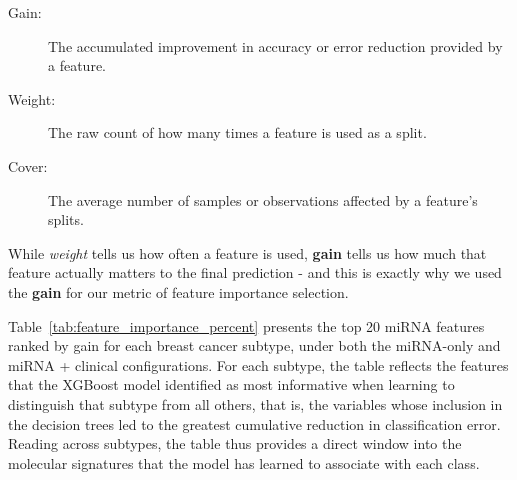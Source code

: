 \begin{description}
    \item[Gain:] The accumulated improvement in accuracy or error reduction provided by a feature.
    \item[Weight:] The raw count of how many times a feature is used as a split.
    \item[Cover:] The average number of samples or observations affected by a feature's splits.
\end{description}

While \textit{weight} tells us how often a feature is used, \textbf{gain} tells us how
 much that feature actually matters to the final prediction - and this is exactly why we
  used the \textbf{gain} for our metric of feature importance selection.

Table~\ref{tab:feature_importance_percent} presents the top 20 miRNA features ranked 
by gain for each breast cancer subtype, under both the miRNA-only and miRNA + clinical 
configurations. For each subtype, the table reflects the features that the 
XGBoost model identified as most informative when learning to distinguish 
that subtype from all others, that is, the variables whose inclusion in 
the decision trees led to the greatest cumulative reduction in classification 
error. Reading across subtypes, the table thus provides a direct window into 
the molecular signatures that the model has learned to associate with each class.

